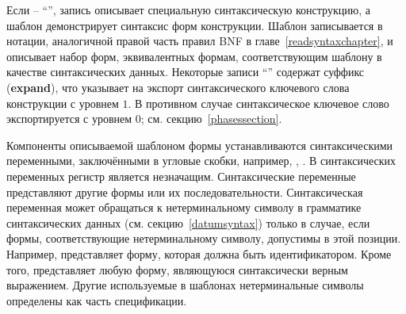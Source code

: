 Если  -- ``\exprtype'', запись описывает специальную синтаксическую
конструкцию, а шаблон демонстрирует синтаксис форм конструкции. Шаблон записывается в
нотации, аналогичной правой часть правил BNF в главе~\ref{readsyntaxchapter}, и описывает
набор форм, эквивалентных формам, соответствующим шаблону в качестве синтаксических
данных. Некоторые записи ``\exprtype'' содержат суффикс ({\bfseries\cf expand}), что указывает
на экспорт синтаксического ключевого слова конструкции с уровнем $1$. В противном случае
синтаксическое ключевое слово экспортируется с уровнем $0$; см. секцию~\ref{phasessection}.\vspace{2mm}

Компоненты описываемой шаблоном формы устанавливаются синтаксическими переменными, заключёнными
в угловые скобки, например, , . В синтаксических переменных
регистр является незначащим. Синтаксические переменные представляют другие формы или их
последовательности. Синтаксическая переменная может обращаться к нетерминальному символу в
грамматике синтаксических данных (см. секцию~\ref{datumsyntax}) только в случае, если формы,
соответствующие нетерминальному символу, допустимы в этой позиции. Например, 
представляет форму, которая должна быть идентификатором. Кроме того, 
представляет любую форму, являющуюся синтаксически верным выражением. Другие используемые
в шаблонах нетерминальные символы определены как часть спецификации.\vspace{2mm}

